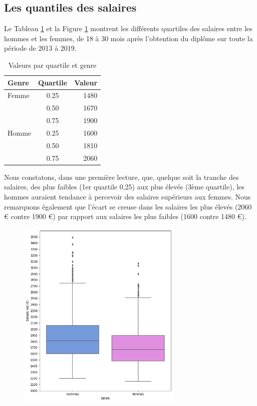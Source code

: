 \documentclass[12pt, a4paper, titlepage, table]{article}
\begin{document}
	\subsection{Les quantiles des salaires}	
	Le Tableau \ref{tab:quartile_salaire_genre} et la Figure \ref{fig:boxplot_salaire_genre} montrent les différents quartiles des salaires entre les hommes et les femmes, de 18 à 30 mois après l'obtention du diplôme sur toute la période de 2013 à 2019.
	
		\begin{table}[H]
			\centering
			\begin{tabular}{lcr}
				\toprule
				\textbf{Genre} & \textbf{Quartile} & \textbf{Valeur} \\
				\midrule
				Femme & 0.25 & 1480 \\
				& 0.50 & 1670 \\
				& 0.75 & 1900 \\
				\midrule
				Homme & 0.25 & 1600 \\
				& 0.50 & 1810 \\
				& 0.75 & 2060 \\
				\bottomrule
			\end{tabular}
			\caption{Valeurs par quartile et genre}
			\label{tab:quartile_salaire_genre}
		\end{table}
	
	Nous constatons, dans une première lecture, que, quelque soit la tranche des salaires, des plus faibles (1er quartile 0,25) aux plus élevés (3ème quartile), les hommes auraient tendance à percevoir des salaires supérieurs aux femmes. Nous remarquons également que l'écart se creuse dans les salaires les plus élevés (2060 € contre 1900 €) par rapport aux salaires les plus faibles (1600 contre 1480 €).
		
	
	\begin{figure}[H]
		\centering
		\includegraphics[width=0.7\textwidth]{../graphs/boxplot_salaire_genre.png}
		\label{fig:boxplot_salaire_genre}
	\end{figure}
	
\end{document}
